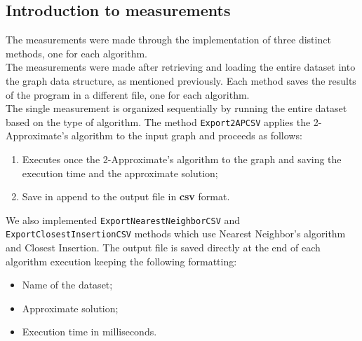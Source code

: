 \subsection{Introduction to measurements}
The measurements were made through the implementation of three distinct methods, one for each algorithm. \\ \noindent
The measurements were made after retrieving and loading the entire dataset into the graph data structure, as mentioned 
previously. Each method saves the results of the program in a different file, one for each algorithm.\\
\noindent
The single measurement is organized sequentially by running the entire dataset based on the type of algorithm. 
The method \verb|Export2APCSV| applies the 2-Approximate's algorithm to the input graph and proceeds as follows:
\begin{enumerate}
    \item Executes once the 2-Approximate's algorithm to the graph and saving the execution time and the approximate solution;
    \item Save in append to the output file in \textbf{csv} format. 
\end{enumerate}
We also implemented \verb|ExportNearestNeighborCSV| and \verb|ExportClosestInsertionCSV| methods which use Nearest Neighbor's algorithm and Closest Insertion.
\noindent
The output file is saved directly at the end of each algorithm execution keeping the following formatting:
\begin{itemize}
    \item Name of the dataset;
    \item Approximate solution;
    \item Execution time in milliseconds.
\end{itemize}